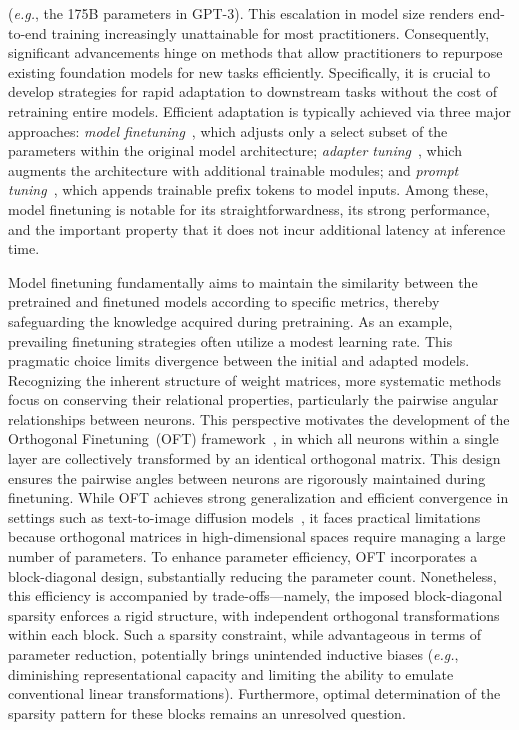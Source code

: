 (\emph{e.g.}, the 175B parameters in GPT-3). This escalation in model size renders end-to-end training increasingly unattainable for most practitioners. Consequently, significant advancements hinge on methods that allow practitioners to repurpose existing foundation models for new tasks efficiently. Specifically, it is crucial to develop strategies for rapid adaptation to downstream tasks without the cost of retraining entire models. Efficient adaptation is typically achieved via three major approaches: \emph{model finetuning}~\cite{hulora2022,zaken2022bitfit,guo2020parameter,raffel2020exploring,qiu2023controlling,zhang2022adaptive,chavan2023one}, which adjusts only a select subset of the parameters within the original model architecture; \emph{adapter tuning}~\cite{rebuffi2017learning,houlsby2019parameter,pfeiffer2020adapterfusion,lin2020exploring,he2021towards}, which augments the architecture with additional trainable modules; and \emph{prompt tuning}~\cite{li2021prefix,lester2021power}, which appends trainable prefix tokens to model inputs. Among these, model finetuning is notable for its straightforwardness, its strong performance, and the important property that it does not incur additional latency at inference time.

Model finetuning fundamentally aims to maintain the similarity between the pretrained and finetuned models according to specific metrics, thereby safeguarding the knowledge acquired during pretraining. As an example, prevailing finetuning strategies often utilize a modest learning rate. This pragmatic choice limits divergence between the initial and adapted models. Recognizing the inherent structure of weight matrices, more systematic methods focus on conserving their relational properties, particularly the pairwise angular relationships between neurons. This perspective motivates the development of the Orthogonal Finetuning~(OFT) framework~\cite{qiu2023controlling}, in which all neurons within a single layer are collectively transformed by an identical orthogonal matrix. This design ensures the pairwise angles between neurons are rigorously maintained during finetuning. While OFT achieves strong generalization and efficient convergence in settings such as text-to-image diffusion models~\cite{qiu2023controlling}, it faces practical limitations because orthogonal matrices in high-dimensional spaces require managing a large number of parameters. To enhance parameter efficiency, OFT incorporates a block-diagonal design, substantially reducing the parameter count. Nonetheless, this efficiency is accompanied by trade-offs—namely, the imposed block-diagonal sparsity enforces a rigid structure, with independent orthogonal transformations within each block. Such a sparsity constraint, while advantageous in terms of parameter reduction, potentially brings unintended inductive biases (\emph{e.g.}, diminishing representational capacity and limiting the ability to emulate conventional linear transformations). Furthermore, optimal determination of the sparsity pattern for these blocks remains an unresolved question.

